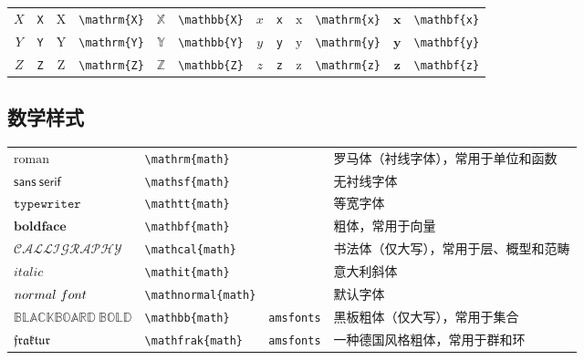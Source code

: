 \documentclass{ctexbook}
\begin{document}
\begin{table}[th]
\begin{tabular}{ c@{ }l c@{ }l c@{ }l c@{ }l c@{ }l c@{ }l}
		$X$ & \verb|X| & $\mathrm{X}$ & \verb|\mathrm{X}| & $\mathbb{X}$ & \verb|\mathbb{X}| & $x$ & \verb|x| & $\mathrm{x}$ & \verb|\mathrm{x}| & $\mathbf{x}$ & \verb|\mathbf{x}| \\
		$Y$ & \verb|Y| & $\mathrm{Y}$ & \verb|\mathrm{Y}| & $\mathbb{Y}$ & \verb|\mathbb{Y}| & $y$ & \verb|y| & $\mathrm{y}$ & \verb|\mathrm{y}| & $\mathbf{y}$ & \verb|\mathbf{y}| \\
		$Z$ & \verb|Z| & $\mathrm{Z}$ & \verb|\mathrm{Z}| & $\mathbb{Z}$ & \verb|\mathbb{Z}| & $z$ & \verb|z| & $\mathrm{z}$ & \verb|\mathrm{z}| & $\mathbf{z}$ & \verb|\mathbf{z}| \\
		\hline
	\end{tabular}
\end{table}

\newpage
\subsection{数学样式}

\begin{table}[h]
	\centering
	\begin{tabular}{l l l l}
		\hline
		$\mathrm{roman}$            & \verb|\mathrm{|{\color{gray}\verb|math|}\verb|}|     &                 & 罗马体（衬线字体），常用于单位和函数 \\
		$\mathsf{sans\ serif}$      & \verb|\mathsf{|{\color{gray}\verb|math|}\verb|}|     &                 & 无衬线字体 \\
		$\mathtt{typewriter}$       & \verb|\mathtt{|{\color{gray}\verb|math|}\verb|}|     &                 & 等宽字体 \\
		$\mathbf{bold face}$        & \verb|\mathbf{|{\color{gray}\verb|math|}\verb|}|     &                 & 粗体，常用于向量 \\
		$\mathcal{CALLIGRAPHY}$     & \verb|\mathcal{|{\color{gray}\verb|math|}\verb|}|    &                 & 书法体（仅大写），常用于层、概型和范畴 \\
		$\mathit{italic}$           & \verb|\mathit{|{\color{gray}\verb|math|}\verb|}|     &                 & 意大利斜体 \\
		$\mathnormal{normal\ font}$ & \verb|\mathnormal{|{\color{gray}\verb|math|}\verb|}| &                 & 默认字体 \\
		\hline
		$\mathbb{BLACKBOARD\ BOLD}$ & \verb|\mathbb{|{\color{gray}\verb|math|}\verb|}|     & \verb|amsfonts| & 黑板粗体（仅大写），常用于集合 \\
		$\mathfrak{fraktur}$        & \verb|\mathfrak{|{\color{gray}\verb|math|}\verb|}|   & \verb|amsfonts| & 一种德国风格粗体，常用于群和环 \\
		\hline
	\end{tabular}
\end{table}
\end{document}
